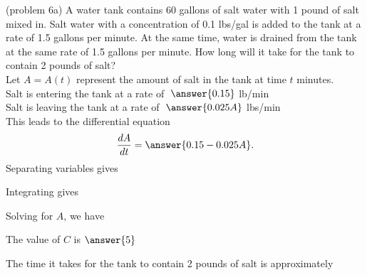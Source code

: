 \documentclass[handout]{ximera}
\begin{document}
\begin{problem}(problem 6a)
A water tank contains 60 gallons of salt water with 1 pound of salt mixed in. 
Salt water with a concentration of 0.1 lbs/gal is added to the tank at a rate of 1.5 gallons per minute.
At the same time, water is drained from the tank at the same rate of 1.5 gallons per minute.
How long will it take for the tank to contain 2 pounds of salt?\\


Let $A = A(t)$ represent the amount of salt in the tank at time $t$ minutes. \\


Salt is entering the tank at a rate of $\; \answer{0.15}$ \; lb/min \\
Salt is leaving the tank at a rate of $\; \answer{0.025A}$ \; lbs/min \\

This leads to the differential equation
\[
\frac{dA}{dt} = \answer{0.15 - 0.025A}.
\]
Separating variables gives

\begin{multipleChoice}
\end{multipleChoice}


Integrating gives
\begin{multipleChoice}
\end{multipleChoice}


Solving for $A$, we have

\begin{multipleChoice}
\end{multipleChoice}

The value of $C$ is $\answer{5}$

The time it takes for the tank to contain 2 pounds of salt  is approximately

\begin{multipleChoice}
\end{multipleChoice}

\end{problem}
\end{document}

